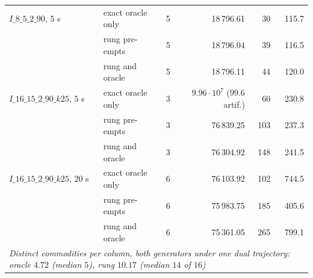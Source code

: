 \begin{table}[!htbp]
\begin{tabular}{llrrrr}
$I\_8\_5\_2\_90$, $5$ s      & exact oracle only & 5 & 18\,796.61 & 30 & 115.7 \\
                             & rung pre-empts    & 5 & 18\,796.04 & 39 & 116.5 \\
                             & rung and oracle   & 5 & 18\,796.11 & 44 & 120.0 \\
\midrule
$I\_16\_15\_2\_90\_k25$, $5$ s & exact oracle only & 3 & $9.96\cdot10^{7}$ ($99.6$ artif.) & 60 & 230.8 \\
                             & rung pre-empts    & 3 & 76\,839.25 & 103 & 237.3 \\
                             & rung and oracle   & 3 & 76\,304.92 & 148 & 241.5 \\
\midrule
$I\_16\_15\_2\_90\_k25$, $20$ s & exact oracle only & 6 & 76\,103.92 & 102 & 744.5 \\
                             & rung pre-empts    & 6 & 75\,983.75 & 185 & 405.6 \\
                             & rung and oracle   & 6 & 75\,361.05 & 265 & 799.1 \\
\midrule
\multicolumn{6}{l}{\emph{Distinct commodities per column, both generators under
one dual trajectory: oracle $4.72$ (median $5$), rung $10.17$ (median $14$ of $16$)}} \\

\end{tabular}
\end{table}

